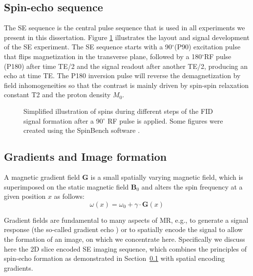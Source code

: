 \subsection{Spin-echo sequence}
\label{sec:chapter2 spin echo}
The {\gls{SE}} sequence is the central pulse sequence that is used in all experiments we present in this dissertation. Figure \ref{fig:chap2 SE sequence} illustrates the layout and signal development of the \gls{SE} experiment. The \gls{SE} sequence starts with a 90$^\circ$(P90) excitation pulse that flips magnetization in the transverse plane, followed by a 180$^\circ$RF pulse (P180) after time TE/2 and the signal readout after another TE/2, producing an echo at time TE. The P180 inversion pulse will reverse the demagnetization by field inhomogeneities so that the contrast is mainly driven by spin-spin relaxation constant T2 and the proton density $M_0$. 

\begin{figure}[ht]
\centering
{}
\caption{Simplified illustration of spins during different steps of the FID signal formation after a 90$^\circ$ RF pulse is applied. Some figures were created using the SpinBench software \citep{Overall:2007}.}
\label{fig:chap2 SE sequence}
\end{figure}


\subsection{Gradients and Image formation}
A magnetic gradient field $\textbf{G}$ is a small spatially varying magnetic field, which is superimposed on the static magnetic field $\mathbf{B}_{0}$ and alters the spin frequency at a given position $x$ as follows:
\begin{equation}
\omega(x)= \omega_0 + \gamma \cdot \textbf{G}(x)
\end{equation}

Gradient fields are fundamental to many aspects of MR, e.g., to generate a signal response (the so-called gradient echo ) or to spatially encode the signal to allow the formation of an image, on which we concentrate here.  Specifically we discuss here the 2D slice encoded SE imaging sequence, which combines the principles of spin-echo formation as demonstrated in Section~\ref{sec:chapter2 spin echo} with spatial encoding gradients.

